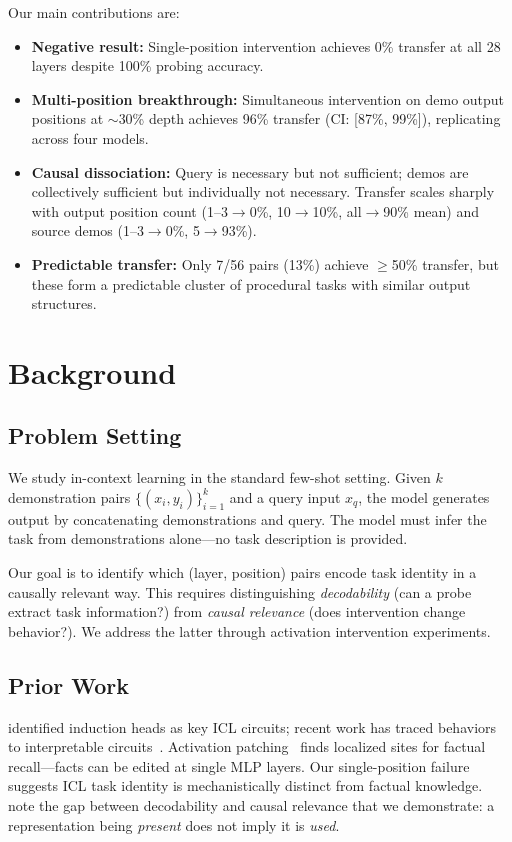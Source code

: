 \documentclass[sigconf,anonymous]{acmart}
\begin{document}
Our main contributions are:
\begin{itemize}
    \item \textbf{Negative result:} Single-position intervention achieves 0\% transfer at all 28 layers despite 100\% probing accuracy.
    \item \textbf{Multi-position breakthrough:} Simultaneous intervention on demo output positions at $\sim$30\% depth achieves 96\% transfer (CI: [87\%, 99\%]), replicating across four models.
    \item \textbf{Causal dissociation:} Query is necessary but not sufficient; demos are collectively sufficient but individually not necessary. Transfer scales sharply with output position count (1--3$\to$0\%, 10$\to$10\%, all$\to$90\% mean) and source demos (1--3$\to$0\%, 5$\to$93\%).
    \item \textbf{Predictable transfer:} Only 7/56 pairs (13\%) achieve $\geq$50\% transfer, but these form a predictable cluster of procedural tasks with similar output structures.
\end{itemize}

\section{Background}
\label{sec:background}

\subsection{Problem Setting}

We study in-context learning in the standard few-shot setting. Given $k$ demonstration pairs $\{(x_i, y_i)\}_{i=1}^k$ and a query input $x_q$, the model generates output by concatenating demonstrations and query. The model must infer the task from demonstrations alone---no task description is provided.

Our goal is to identify which (layer, position) pairs encode task identity in a causally relevant way. This requires distinguishing \emph{decodability} (can a probe extract task information?) from \emph{causal relevance} (does intervention change behavior?). We address the latter through activation intervention experiments.

\subsection{Prior Work}

\citet{olsson2022context} identified induction heads as key ICL circuits; recent work has traced behaviors to interpretable circuits~\cite{wang2023interpretability,conmy2023towards}. Activation patching~\cite{vig2020investigating,meng2022locating} finds localized sites for factual recall---facts can be edited at single MLP layers. Our single-position failure suggests ICL task identity is mechanistically distinct from factual knowledge. \citet{belinkov2019analysis} note the gap between decodability and causal relevance that we demonstrate: a representation being \emph{present} does not imply it is \emph{used}.
\end{document}
